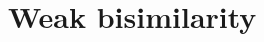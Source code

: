\documentclass[aspectratio=169]{beamer}
\begin{document}
%
%
%
%
%






\section{Weak bisimilarity}




\end{document}
